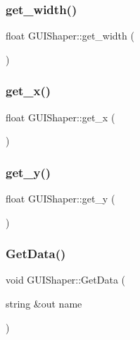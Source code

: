 \subsubsection{\texorpdfstring{get\+\_\+width()}{get\_width()}}
{\footnotesize\ttfamily float G\+U\+I\+Shaper\+::get\+\_\+width (\begin{DoxyParamCaption}{ }\end{DoxyParamCaption})}

\hypertarget{class_g_u_i_shaper_a0e575d8736a7fdee0a6fcbae8c752264}{}\label{class_g_u_i_shaper_a0e575d8736a7fdee0a6fcbae8c752264} 
\subsubsection{\texorpdfstring{get\+\_\+x()}{get\_x()}}
{\footnotesize\ttfamily float G\+U\+I\+Shaper\+::get\+\_\+x (\begin{DoxyParamCaption}{ }\end{DoxyParamCaption})}

\hypertarget{class_g_u_i_shaper_ad0fa9c52284a32f7e3b63f1c41b6253b}{}\label{class_g_u_i_shaper_ad0fa9c52284a32f7e3b63f1c41b6253b} 
\subsubsection{\texorpdfstring{get\+\_\+y()}{get\_y()}}
{\footnotesize\ttfamily float G\+U\+I\+Shaper\+::get\+\_\+y (\begin{DoxyParamCaption}{ }\end{DoxyParamCaption})}

\hypertarget{class_g_u_i_shaper_a3b3f189322dc26e10726d2f972a627b0}{}\label{class_g_u_i_shaper_a3b3f189322dc26e10726d2f972a627b0} 
\subsubsection{\texorpdfstring{Get\+Data()}{GetData()}}
{\footnotesize\ttfamily void G\+U\+I\+Shaper\+::\+Get\+Data (\begin{DoxyParamCaption}\item[{string \&out}]{name }\end{DoxyParamCaption})}


